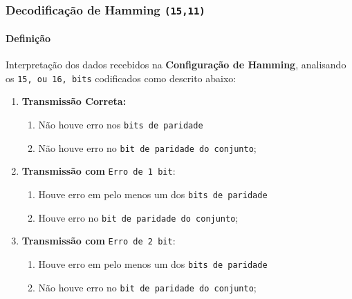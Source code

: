 \documentclass{article}
\begin{document}
        \subsubsection{Decodificação de Hamming \texttt{(15,11)}}
            \paragraph{Definição}Interpretação dos dados recebidos na \textbf{Configuração de Hamming}, analisando os \texttt{15, ou 16, bits} codificados como descrito abaixo:
                \begin{enumerate}[rightmargin = \leftmargin]
                    \item \textbf{Transmissão Correta:} 
                        \begin{enumerate}[noitemsep, rightmargin = \leftmargin]
                            \item Não houve erro nos \textcolor{red!80}{\texttt{bits de paridade}}
                            \item Não houve erro no \textcolor{blue!80}{\texttt{bit de paridade do conjunto}};
                        \end{enumerate}

                    \item \textbf{Transmissão com} \texttt{Erro de 1 bit}:
                        \begin{enumerate}[noitemsep, rightmargin = \leftmargin]
                            \item Houve erro em pelo menos um dos \textcolor{red!80}{\texttt{bits de paridade}}
                            \item Houve erro no \textcolor{blue!80}{\texttt{bit de paridade do conjunto}};
                        \end{enumerate}

                    \item \textbf{Transmissão com} \texttt{Erro de 2 bit}:
                        \begin{enumerate}[noitemsep, rightmargin = \leftmargin]
                            \item Houve erro em pelo menos um dos \textcolor{red!80}{\texttt{bits de paridade}}
                            \item Não houve erro no \textcolor{blue!80}{\texttt{bit de paridade do conjunto}};
                        \end{enumerate}
                \end{enumerate}
\end{document}
